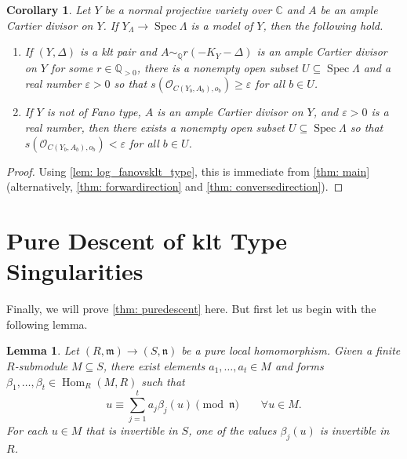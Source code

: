 \documentclass[11pt,leqno]{amsart}
\numberwithin{equation}{section}
\newtheorem{lemma}[theorem]{Lemma}
\newtheorem{corollary}[theorem]{Corollary}
\theoremstyle{definition}
\theoremstyle{remark}
\renewcommand{\O}{\mathcal{O}}
\newcommand{\C}{\mathbb{C}}
\newcommand{\Q}{\mathbb{Q}}
\newcommand{\Spec}{\operatorname{Spec}}
\providecommand{\frm}{}
\renewcommand{\frm}{\mathfrak{m}}
\DeclareMathOperator{\Hom}{Hom}
\begin{document}
\begin{corollary} \label{cor: section_global_version}
Let $Y$ be a normal projective variety over $\C$ and $A$ be an ample Cartier divisor on $Y$. If $Y_\Lambda \to \Spec \Lambda$ is a model of $Y$, then the following hold. 

\begin{enumerate}
\item If $(Y, \Delta)$ is a klt pair and $A \sim_\Q r(-K_Y - \Delta)$ is an ample Cartier divisor on $Y$ for some $r \in \Q_{> 0}$, there is a nonempty open subset $U \subseteq \Spec \Lambda$ and a real number $\varepsilon > 0$ so that $s(\O_{C(Y_b, A_b), o_b}) \geq \varepsilon$ for all $b \in U$.
\item If $Y$ is not of Fano type, $A$ is an ample Cartier divisor on $Y$, and $\varepsilon > 0$ is a real number, then there exists a nonempty open subset $U \subseteq \Spec \Lambda$ so that $s(\O_{C(Y_b, A_b), o_b}) < \varepsilon$ for all $b \in U$.
\end{enumerate}
\end{corollary}
\begin{proof}
 Using \cref{lem: log_fanovsklt_type}, this is immediate from \cref{thm: main} (alternatively, \cref{thm: forwardirection} and \cref{thm: conversedirection}).
\end{proof}



\section{Pure Descent of klt Type Singularities}

Finally, we will prove \cref{thm: puredescent} here. But first let us begin with the following lemma.

\begin{lemma} \label{lem: purefunctionals}
Let $(R,\frm) \to (S,\mathfrak{n})$ be a pure local homomorphism. Given a finite $R$-submodule $M \subseteq S$, there exist elements $a_1,\ldots,a_t \in M$ and forms $\beta_1,\ldots,\beta_t \in \Hom_R(M,R)$ such that
\[
 u \equiv \sum_{j=1}^t a_j \beta_j(u) \pmod{\mathfrak{n}}\qquad \forall u \in M.
\]
For each $u \in M$ that is invertible in $S$, one of the values $\beta_j(u)$ is invertible in $R$.
\end{lemma}
\end{document}
